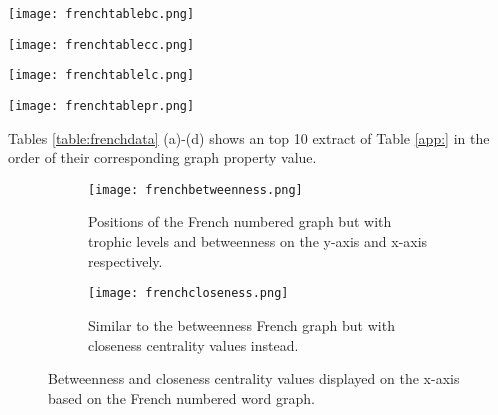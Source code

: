 \begin{table}[H]
\centering
\begin{subtable}{.27\textwidth}
	\texttt{[image: frenchtablebc.png]}
	\caption{}
	\label{table:frenchtablebc}
\end{subtable}
\hfill
\begin{subtable}{.2\textwidth}
	\centering
	\texttt{[image: frenchtablecc.png]}
	\caption{}
	\label{table:frenchtablecc}
\end{subtable}
\hfill
\begin{subtable}{.2\textwidth}
	\centering
	\texttt{[image: frenchtablelc.png]}
	\caption{}
	\label{table:frenchtablelc}
\end{subtable}
\hfill
\begin{subtable}{.2\textwidth}
	\centering
	\texttt{[image: frenchtablepr.png]}
	\caption{}
	\label{table:frenchtablepr}
\end{subtable}
\caption{}
\label{table:frenchdata}
\end{table}

Tables \ref{table:frenchdata} (a)-(d) shows an top 10 extract of Table \ref{app:} in the order of their corresponding graph property value.

\begin{figure}[H]
\centering
\begin{subfigure}{.45\textwidth}
	\hspace{-1cm} 
	\texttt{[image: frenchbetweenness.png]}
	\caption{Positions of the French numbered graph but with trophic levels and betweenness on the y-axis and x-axis respectively.}
	\label{fig:frbc}
\end{subfigure}
\hfill
\begin{subfigure}{.45\textwidth}
	\hspace{-1cm} 
	\texttt{[image: frenchcloseness.png]}
	\caption{Similar to the betweenness French graph but with closeness centrality values instead. }
	\label{fig:frcc}
\end{subfigure}
\caption{Betweenness and closeness centrality values displayed on the x-axis based on the French numbered word graph.}
\label{fig:frcentrality}
\end{figure}

